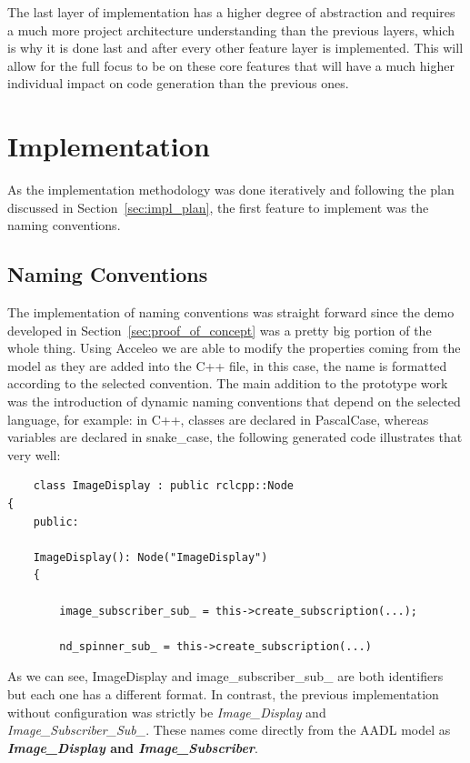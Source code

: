 The last layer of implementation has a higher degree of abstraction and requires a much more project architecture understanding than the previous layers, which is why it is done last and after every other feature layer is implemented. This will allow for the full focus to be on these core features that will have a much higher individual impact on code generation than the previous ones.

\section{Implementation}
\label{sec:implementation}


As the implementation methodology was done iteratively and following the plan discussed in Section~\ref{sec:impl_plan}, the first feature to implement was the naming conventions.

\subsection{Naming Conventions}
\label{sec:impl_name_conv}

The implementation of naming conventions was straight forward since the demo developed in Section~\ref{sec:proof_of_concept} was a pretty big portion of the whole thing. Using Acceleo we are able to modify the properties coming from the model as they are added into the C++ file, in this case, the name is formatted according to the selected convention. The main addition to the prototype work was the introduction of dynamic naming conventions that depend on the selected language, for example: in C++, classes are declared in PascalCase, whereas variables are declared in snake\_case, the following generated code illustrates that very well:

\begin{verbatim}
	class ImageDisplay : public rclcpp::Node
{
	public:
	
	ImageDisplay(): Node("ImageDisplay")
	{
		
		image_subscriber_sub_ = this->create_subscription(...);
		
		nd_spinner_sub_ = this->create_subscription(...)
\end{verbatim}

As we can see, ImageDisplay and image\_subscriber\_sub\_ are both identifiers but each one has a different format. In contrast, the previous implementation without configuration was strictly be \textit{Image\_Display} and \textit{Image\_Subscriber\_Sub\_}. These names come directly from the \gls{AADL} model as \textbf{\textit{Image\_Display} and \textit{Image\_Subscriber}}.

